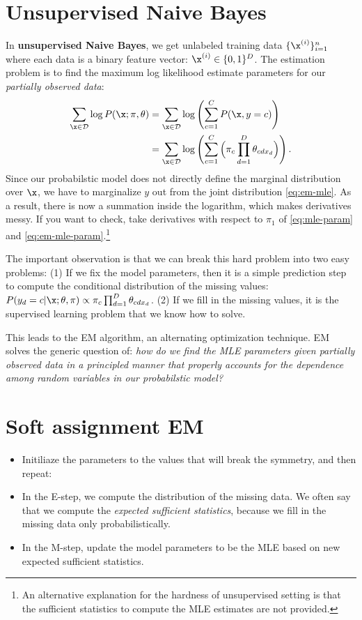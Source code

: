\documentclass{discussion}
\begin{document}
\section{Unsupervised Naive Bayes}
In \textbf{unsupervised Naive Bayes}, we get unlabeled training data $\{\x^{(i)}\}_{i=1}^{n}$ where each data is a binary feature vector: $\x^{(i)} \in \{0,1\}^D$. The estimation problem is to find the maximum log likelihood estimate parameters for our \emph{partially observed data}:
\begin{align}
\label{eq:em-mle}
\sum_{\x \in \mathcal{D}} \log P(\x; \pi, \theta)
&= \sum_{\x \in \mathcal{D}} \log \left(\sum_{c=1}^{C} P(\x,y = c)\right) \\
&= \sum_{\x \in \mathcal{D}} \log\left(\sum_{c=1}^{C} \Big(\pi_{c} \prod_{d=1}^{D} \theta_{cdx_d} \Big) \right) \label{eq:em-mle-param}.
\end{align}
Since our probabilstic model does not directly define the marginal distribution over $\x$, we have to marginalize $y$ out from the joint distribution \eqref{eq:em-mle}. As a result, there is now a summation inside the logarithm, which makes derivatives messy. If you want to check, take derivatives with respect to $\pi_1$ of \eqref{eq:mle-param} and \eqref{eq:em-mle-param}.\footnote{An alternative explanation for the hardness of unsupervised setting is that the sufficient statistics to compute the MLE estimates are not provided.
}
 
The important observation is that we can break this hard problem into two easy problems: (1) If we fix the model parameters, then it is a simple prediction step to compute the conditional distribution of the missing values: $P(y_d = c | \x; \theta, \pi) \propto \pi_{c} \prod_{d=1}^{D} \theta_{c d x_d}$. (2) If we fill in the missing values, it is the supervised learning problem that we know how to solve.

This leads to the EM algorithm, an alternating optimization technique. EM solves the generic question of: \emph{how do we find the MLE parameters given partially observed data in a principled manner that properly accounts for the dependence among random variables in our probabilstic model?}

\section{Soft assignment EM}

\begin{itemize}
    \item Initiliaze the parameters to the values that will break the symmetry, and then repeat:
    \item In the E-step, we compute the distribution of the missing data. We often say that we compute the \emph{expected sufficient statistics}, because we fill in the missing data only probabilistically.
    \item In the M-step, update the model parameters to be the MLE based on new expected sufficient statistics.
\end{itemize}
\end{document}
